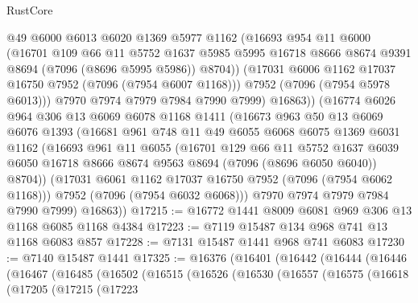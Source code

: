 \begin{lexlean}{RustCore}
\begin{coremodule}
              @49
              @6000
              @6013
              @6020
              @1369
              @5977
              @1162
              (@16693
                @954
                @11
                @6000
                (@16701
                  @109
                  @66
                  @11
                  @5752
                  @1637
                  @5985
                  @5995
                  @16718
                  @8666
                  @8674
                  @9391
                  @8694
                  (@7096 (@8696 @5995 @5986))
                  @8704))
              (@17031 @6006 @1162 @17037 @16750 @7952 (@7096 (@7954 @6007 @1168)))
              @7952
              (@7096 (@7954 @5978 @6013)))
            @7970
            @7974
            @7979
            @7984
            @7990
            @7999)
          @16863))
      (@16774
        @6026
        @964
        @306
        @13
        @6069
        @6078
        @1168
        @1411
        (@16673
          @963
          @50
          @13
          @6069
          @6076
          @1393
          (@16681
            @961
            @748
            @11
            @49
            @6055
            @6068
            @6075
            @1369
            @6031
            @1162
            (@16693
              @961
              @11
              @6055
              (@16701
                @129
                @66
                @11
                @5752
                @1637
                @6039
                @6050
                @16718
                @8666
                @8674
                @9563
                @8694
                (@7096 (@8696 @6050 @6040))
                @8704))
            (@17031 @6061 @1162 @17037 @16750 @7952 (@7096 (@7954 @6062 @1168)))
            @7952
            (@7096 (@7954 @6032 @6068)))
          @7970
          @7974
          @7979
          @7984
          @7990
          @7999)
        @16863))
@17215 := @16772 @1441 @8009 @6081 @969 @306 @13 @1168 @6085 @1168 @4384
@17223 := @7119 @15487 @134 @968 @741 @13 @1168 @6083 @857
@17228 := @7131 @15487 @1441 @968 @741 @6083
@17230 := @7140 @15487 @1441
@17325 := @16376
    (@16401
      (@16442
        (@16444
          (@16446
            (@16467
              (@16485
                (@16502
                  (@16515
                    (@16526
                      (@16530
                        (@16557
                          (@16575
                            (@16618
                              (@17205
                                (@17215
                                  (@17223

\end{coremodule}
\end{lexlean}
